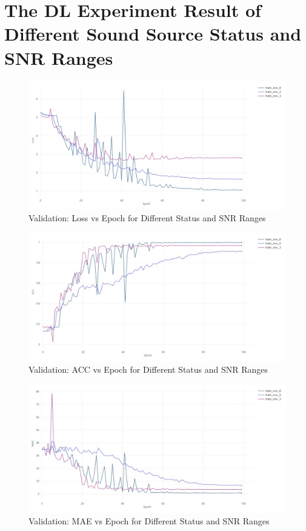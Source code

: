 \section*{The DL Experiment Result of Different Sound Source Status and SNR Ranges}
\begin{figure}[H]
    \centering
    \includegraphics[width=1\linewidth]{figures/StatusSNR Valid_ Loss VS epoch.jpeg}
    \caption{Validation: Loss vs Epoch for Different Status and SNR Ranges}
\end{figure}
\begin{figure}[H]
    \centering
    \includegraphics[width=1\linewidth]{figures/StatusSNR Valid_ ACC VS epoch.jpeg}
    \caption{Validation: ACC vs Epoch for Different Status and SNR Ranges}
\end{figure}
\begin{figure}[H]
    \centering
    \includegraphics[width=1\linewidth]{figures/StatusSNR Valid_ MAE VS epoch.jpeg}
    \caption{Validation: MAE vs Epoch for Different Status and SNR Ranges}
\end{figure}
